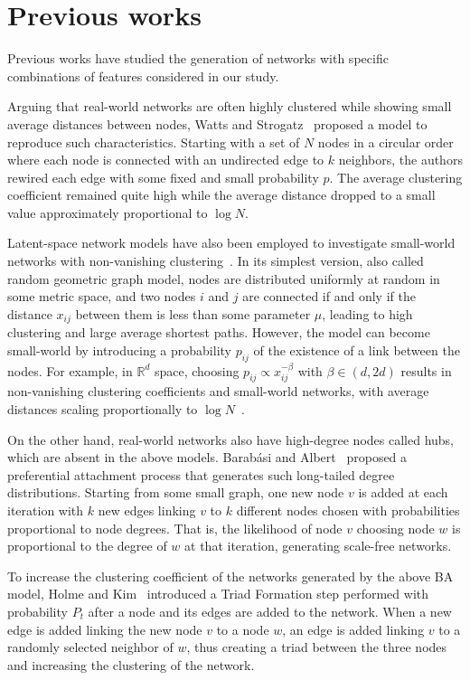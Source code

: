 \section{Previous works}
Previous works have studied the generation of networks with specific combinations of features considered in our study. 

Arguing that real-world networks are often highly clustered while showing small average distances between nodes, Watts and Strogatz~\cite{1998Watts} proposed a model to reproduce such characteristics. Starting with a set of $N$ nodes in a circular order where each node is connected with an undirected edge to $k$ neighbors, the authors rewired each edge with some fixed and small probability $p$. The average clustering coefficient remained quite high while the average distance dropped to a small value approximately proportional to $\log N$. 

Latent-space network models have also been employed to investigate small-world networks with non-vanishing clustering~\cite{Bogu2021}. 
In its simplest version, also called random geometric graph model, nodes are distributed uniformly at random in some metric space, and two nodes $i$ and $j$ are connected if and only if the distance $x_{i j}$ between them is less than some parameter $\mu$, leading to high clustering and large average shortest paths. 
However, the model can become small-world by introducing a probability $p_{i j}$ of the existence of a link between the nodes. 
For example, in $\mathbb{R}^d$ space, choosing $p_{i j} \propto x_{i j}^{-\beta}$ with $\beta \in (d, 2d)$ results in non-vanishing clustering coefficients and small-world networks, with average distances scaling proportionally to $\log N$~\cite{Bogu2020}. 

On the other hand, real-world networks also have high-degree nodes called hubs, which are absent in the above models. 
Barabási and Albert~\cite{1999Barabasi} proposed a preferential attachment process that generates such long-tailed degree distributions. 
Starting from some small graph, one new node $v$ is added at each iteration with $k$ new edges linking $v$ to $k$ different nodes chosen with probabilities proportional to node degrees. That is, the likelihood of node $v$ choosing node $w$ is proportional to the degree of $w$ at that iteration, generating scale-free networks.

To increase the clustering coefficient of the networks generated by the above BA model, Holme and Kim~\cite{2002Holme} introduced a Triad Formation step performed with probability $P_t$ after a node and its edges are added to the network. When a new edge is added linking the new node $v$ to a node $w$, an edge is added linking $v$ to a randomly selected neighbor of $w$, thus creating a triad between the three nodes and increasing the clustering of the network. 


